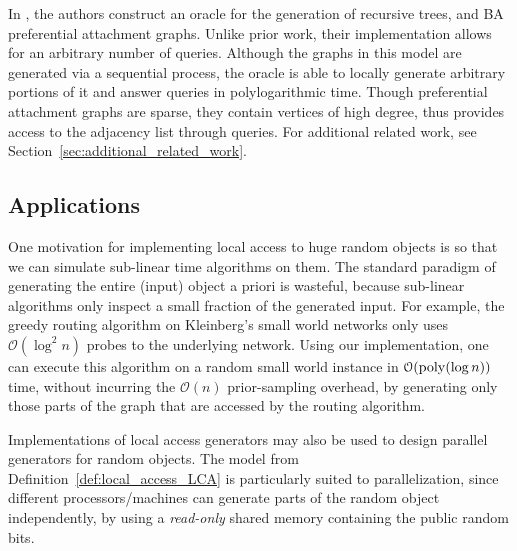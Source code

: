In \cite{reut}, the authors construct an oracle for the generation of recursive trees, and BA preferential attachment graphs.
Unlike prior work, their implementation allows for an arbitrary number of queries.
Although the graphs in this model are generated via a sequential process,
the oracle is able to locally generate arbitrary portions of it and answer queries in polylogarithmic time.
Though preferential attachment graphs are sparse, they contain vertices of high degree,
thus \cite{reut} provides access to the adjacency list through  queries.
For additional related work, see Section~\ref{sec:additional_related_work}.



\subsection{Applications}
\label{sec:applications}
One motivation for implementing local access to huge random objects is so that we can simulate sub-linear time algorithms on them.
The standard paradigm of generating the entire (input) object a priori is wasteful,
because sub-linear algorithms only inspect a small fraction of the generated input.
For example, the greedy routing algorithm on Kleinberg's small world networks \cite{kleinberg}
only uses $\mathcal O(\log^2 n)$ probes to the underlying network.
Using our implementation, one can execute this algorithm on a random small world instance in $\mathcal O(\mathrm{poly}(\log n))$ time,
without incurring the $\mathcal O(n)$ prior-sampling overhead, by generating only those parts of the graph that are accessed by the routing algorithm.

Implementations of local access generators may also be used to design parallel generators for random objects.
The model from Definition~\ref{def:local_access_LCA} is particularly suited to parallelization,
since different processors/machines can generate parts of the random object independently,
by using a \emph{read-only} shared memory containing the public random bits.
